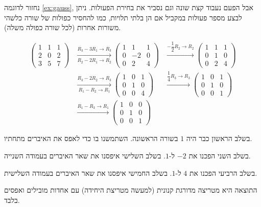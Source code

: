 \documentclass[
  hebrew,
  12pt,
  a4paper,
  oneside]{book}
\theoremstyle{definition}
\theoremstyle{remark}
\theoremstyle{plain}
\theoremstyle{remark}
\begin{document}
\begin{example}

נחזור לדוגמה \ref{ex:gauss}, אבל הפעם נעבוד קצת שונה וגם נסביר את בחירת
הפעולות. ניתן לבצע מספר פעולות במקביל אם הן בלתי תלויות, כמו להחסיר
כפולות של שורה כלשהי משורות אחרות (לכל שורה כפולה משלה).

\[\begin{aligned}
        \begin{pmatrix}1 & 1 & 1 \\ 2 & 0 & 2 \\ 3 & 5 & 7 \end{pmatrix}
        &\xrightarrow[R_2-2R_1 \to R_2]{R_3-3R_1 \to R_3}
        \begin{pmatrix}1 & 1 & 1 \\ 0 & -2 & 0 \\ 0 & 2 & 4\end{pmatrix}
        &\xrightarrow{-\dfrac{1}{2}R_2 \to R_2}
        \begin{pmatrix}1 & 1 & 1 \\ 0 & 1 & 0 \\ 0 & 2 & 4 \end{pmatrix} \\
        &\xrightarrow[R_1-R_2 \to R_1]{R_3-2R_2 \to R_3}
        \begin{pmatrix}1 & 0 & 1 \\ 0 & 1 & 0 \\ 0 & 0 & 4\end{pmatrix}
        &\xrightarrow{\dfrac{1}{4}R_3 \to R_3}
        \begin{pmatrix}1 & 0 & 1 \\ 0 & 1 & 0 \\ 0 & 0 & 1\end{pmatrix} \\
        &\xrightarrow{R_1-R_3 \to R_1}
        \begin{pmatrix}1 & 0 & 0 \\ 0 & 1 & 0 \\ 0 & 0 & 1\end{pmatrix}
    \end{aligned}\]

בשלב הראשון כבר היה \(1\) בשורה הראשונה. השתמשנו בו כדי לאפס את האיברים
מתחתיו.

בשלב השני הפכנו את \(-2\) ל-\(1\). בשלב השלישי איפסנו את שאר האיברים
בעמודה השנייה.

בשלב הרביעי הפכנו את \(4\) ל-\(1\). בשלב החמישי איפסנו את שאר האיברים
בעמודה השלישית.

התוצאה היא מטריצה מדורגת קנונית (למעשה מטריצת היחידה) עם אחדות מובילים
ואפסים בלבד.

\end{example}
\end{document}
